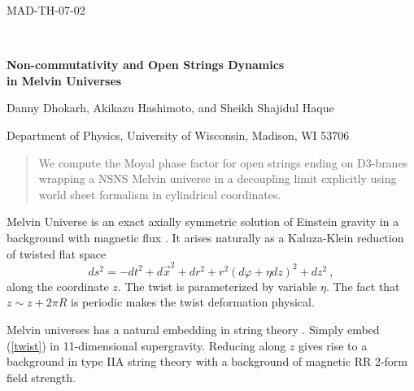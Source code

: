 \documentclass[12pt]{article}
\def\baselinestretch{1.2}
\newcommand{\be}{\begin{equation}}
\newcommand{\ee}{\end{equation}}
\begin{document}
\begin{titlepage}
\begin{flushright}
MAD-TH-07-02
\end{flushright}

\vfil\

\begin{center}


{\Large{\bf Non-commutativity and Open Strings Dynamics\\ in Melvin Universes}}


\vfil

Danny Dhokarh, Akikazu Hashimoto, and 
Sheikh Shajidul Haque

\vfil


Department of Physics, University of Wisconsin, Madison, WI 53706




\vfil

\end{center}

\begin{abstract}
\noindent  We compute the Moyal phase factor for open strings ending on D3-branes wrapping a NSNS Melvin universe in a decoupling limit explicitly using world sheet formalism in cylindrical coordinates.
\end{abstract}
\vspace{0.5in}


\end{titlepage}
\renewcommand{\baselinestretch}{1.05}  %


Melvin Universe is an exact axially symmetric solution of Einstein
gravity in a background with magnetic flux \cite{Melvin:1963qx}. 
It arises naturally as a Kaluza-Klein reduction of twisted flat space
%
\be ds^2 = -dt^2 + d\vec x^2 + dr^2 + r^2 (d \varphi + \eta dz)^2 + dz^2 \ , \label{twist}\ee
%
along the coordinate $z$. The twist is parameterized by variable
$\eta$. The fact that $z \sim z + 2 \pi R$ is periodic makes the twist
deformation physical.

Melvin universes has a natural embedding in string theory
\cite{Dowker:1993bt,Dowker:1994up,Behrndt:1995si}. Simply embed
(\ref{twist}) in 11-dimensional supergravity. Reducing along $z$ gives
rise to a background in type IIA string theory with a background of
magnetic RR 2-form field strength.
\end{document}
